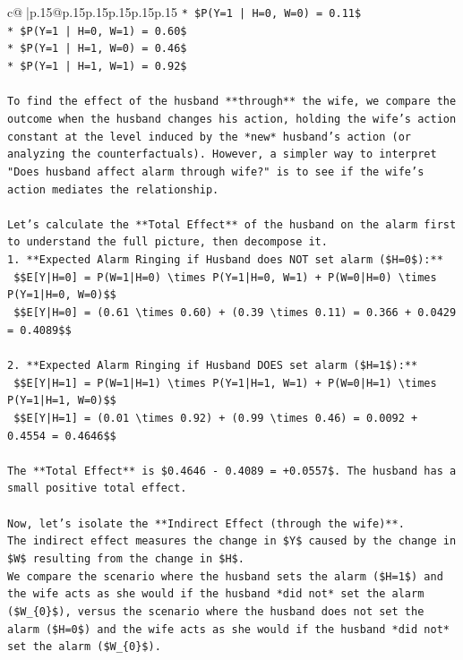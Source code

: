 \documentclass{article}
\begin{document}
{\begin{supertabular}{c@{$\;$}|p{.15\linewidth}@{}p{.15\linewidth}p{.15\linewidth}p{.15\linewidth}p{.15\linewidth}p{.15\linewidth}}
{{{\texttt{*   \$P(Y=1 | H=0, W=0) = 0.11\$} \\
\texttt{*   \$P(Y=1 | H=0, W=1) = 0.60\$} \\
\texttt{*   \$P(Y=1 | H=1, W=0) = 0.46\$} \\
\texttt{*   \$P(Y=1 | H=1, W=1) = 0.92\$} \\
\\ 
\texttt{To find the effect of the husband **through** the wife, we compare the outcome when the husband changes his action, holding the wife's action constant at the level induced by the *new* husband's action (or analyzing the counterfactuals). However, a simpler way to interpret "Does husband affect alarm through wife?" is to see if the wife's action mediates the relationship.} \\
\\ 
\texttt{Let's calculate the **Total Effect** of the husband on the alarm first to understand the full picture, then decompose it.} \\
\texttt{1.  **Expected Alarm Ringing if Husband does NOT set alarm (\$H=0\$):**} \\
\texttt{    \$\$E{[}Y|H=0{]} = P(W=1|H=0) \textbackslash{}times P(Y=1|H=0, W=1) + P(W=0|H=0) \textbackslash{}times P(Y=1|H=0, W=0)\$\$} \\
\texttt{    \$\$E{[}Y|H=0{]} = (0.61 \textbackslash{}times 0.60) + (0.39 \textbackslash{}times 0.11) = 0.366 + 0.0429 = 0.4089\$\$} \\
\\ 
\texttt{2.  **Expected Alarm Ringing if Husband DOES set alarm (\$H=1\$):**} \\
\texttt{    \$\$E{[}Y|H=1{]} = P(W=1|H=1) \textbackslash{}times P(Y=1|H=1, W=1) + P(W=0|H=1) \textbackslash{}times P(Y=1|H=1, W=0)\$\$} \\
\texttt{    \$\$E{[}Y|H=1{]} = (0.01 \textbackslash{}times 0.92) + (0.99 \textbackslash{}times 0.46) = 0.0092 + 0.4554 = 0.4646\$\$} \\
\\ 
\texttt{The **Total Effect** is \$0.4646 {-} 0.4089 = +0.0557\$. The husband has a small positive total effect.} \\
\\ 
\texttt{Now, let's isolate the **Indirect Effect (through the wife)**.} \\
\texttt{The indirect effect measures the change in \$Y\$ caused by the change in \$W\$ resulting from the change in \$H\$.} \\
\texttt{We compare the scenario where the husband sets the alarm (\$H=1\$) and the wife acts as she would if the husband *did not* set the alarm (\$W\_\{0\}\$), versus the scenario where the husband does not set the alarm (\$H=0\$) and the wife acts as she would if the husband *did not* set the alarm (\$W\_\{0\}\$).} \\
}}}
\end{supertabular}}
\end{document}
